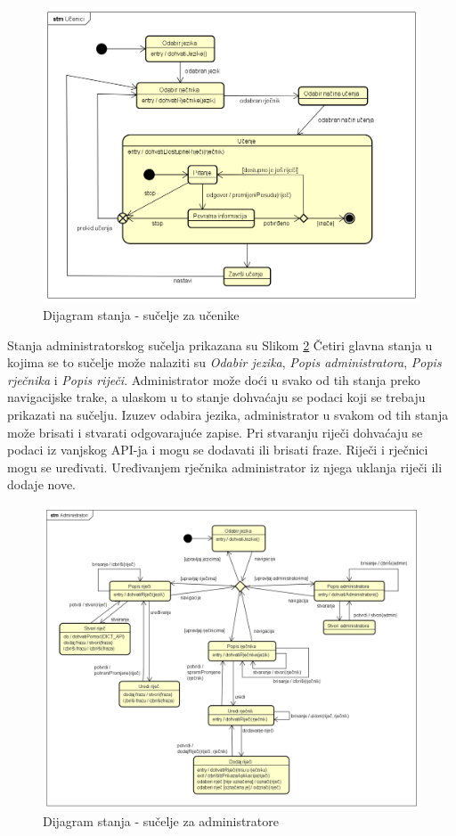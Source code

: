 \begin{figure}[htp]
	\includegraphics[scale=0.5]{dijagrami/state_ucenici.png}
	\centering
	\caption{Dijagram stanja - sučelje za učenike}
	\label{fig:state-ucenici}
	\end{figure}

Stanja administratorskog sučelja prikazana su Slikom \ref{fig:state-admin} Četiri glavna stanja u kojima se to sučelje može nalaziti su  \emph{Odabir jezika}, \emph{Popis administratora}, \emph{Popis rječnika} i \emph{Popis riječi}. Administrator može doći u svako od tih stanja preko navigacijske trake, a ulaskom u to stanje dohvaćaju se podaci koji se trebaju prikazati na sučelju. Izuzev odabira jezika, administrator u svakom od tih stanja može brisati i stvarati odgovarajuće zapise. Pri stvaranju riječi dohvaćaju se podaci iz vanjskog API-ja i mogu se dodavati ili brisati fraze. Riječi i rječnici mogu se uređivati. Uređivanjem rječnika administrator iz njega uklanja riječi ili dodaje nove.


\begin{figure}[htp]
\includegraphics[scale=0.4]{dijagrami/state_administratori.png}
\centering
\caption{Dijagram stanja - sučelje za administratore}
\label{fig:state-admin}
\end{figure}
	

